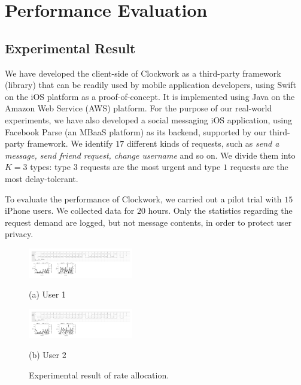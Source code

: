 \section{Performance Evaluation}\label{sec:experiment}

\subsection{Experimental Result}

We have developed the client-side of Clockwork as a third-party framework (library) that can be readily used by mobile application developers, using Swift on the iOS platform as a proof-of-concept.  It is implemented using Java on the Amazon Web Service (AWS) platform. For the purpose of our real-world experiments, we have also developed a social messaging iOS application, using Facebook Parse (an MBaaS platform) as its backend, supported by our third-party framework. We identify $17$ different kinds of requests, such as \emph{send a message, send friend request, change username} and so on. We divide them into $K = 3$ types: type $3$ requests are the most urgent and type $1$ requests are the most delay-tolerant. 

To evaluate the performance of Clockwork, we carried out a pilot trial with $15$ iPhone users. We collected data for $20$ hours. Only the statistics regarding the request demand are logged, but not message contents, in order to protect user privacy.

\begin{figure}[t]
	\centering
	\hspace{-0.5cm}
	\begin{minipage}[t]{1.8in}
		\centering
		\includegraphics[trim=0mm 0mm 0mm 0mm, clip,width=1.8in]{figs/data1}\\
		\centerline{\small{(a) User 1}}
	\end{minipage}
	\hspace{-0.2cm}
	\begin{minipage}[t]{1.8in}
		\centering
		\includegraphics[trim=0mm 0mm 0mm 0mm, clip,width=1.8in]{figs/data2}\\
		\centerline{\small{(b) User 2}}
	\end{minipage}
	\caption{Experimental result of rate allocation.} \label{fig:data}
\end{figure}

